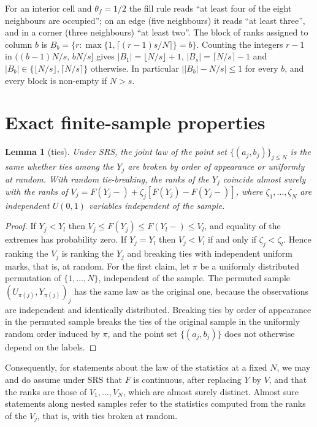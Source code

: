 \documentclass[11pt,a4paper]{article}
\newtheorem{lemma}[theorem]{Lemma}
\theoremstyle{definition}
\theoremstyle{remark}
\begin{document}
For an interior cell and $\theta_f=1/2$ the fill rule reads ``at least four of the eight neighbours are occupied''; on an edge (five neighbours) it reads ``at least three'', and in a corner (three neighbours) ``at least two''. The block of ranks assigned to column $b$ is $B_b=\{r:\max\{1,\lceil(r-1)s/N\rceil\}=b\}$. Counting the integers $r-1$ in $((b-1)N/s,\,bN/s]$ gives $|B_1|=\lfloor N/s\rfloor+1$, $|B_s|=\lceil N/s\rceil-1$ and $|B_b|\in\{\lfloor N/s\rfloor,\lceil N/s\rceil\}$ otherwise. In particular $\big||B_b|-N/s\big|\le1$ for every $b$, and every block is non-empty if $N>s$.

\section{Exact finite-sample properties}\label{sec:finite}

\begin{lemma}[ties]\label{lem:ties}
Under SRS, the joint law of the point set $\{(a_j,b_j)\}_{j\le N}$ is the same whether ties among the $Y_j$ are broken by order of appearance or uniformly at random. With random tie-breaking, the ranks of the $Y_j$ coincide almost surely with the ranks of $V_j=F(Y_j-)+\zeta_j[F(Y_j)-F(Y_j-)]$, where $\zeta_1,\dots,\zeta_N$ are independent $U(0,1)$ variables independent of the sample.
\end{lemma}

\begin{proof}
If $Y_j<Y_l$ then $V_j\le F(Y_j)\le F(Y_l-)\le V_l$, and equality of the extremes has probability zero. If $Y_j=Y_l$ then $V_j<V_l$ if and only if $\zeta_j<\zeta_l$. Hence ranking the $V_j$ is ranking the $Y_j$ and breaking ties with independent uniform marks, that is, at random. For the first claim, let $\pi$ be a uniformly distributed permutation of $\{1,\dots,N\}$, independent of the sample. The permuted sample $(U_{\pi(j)},Y_{\pi(j)})_j$ has the same law as the original one, because the observations are independent and identically distributed. Breaking ties by order of appearance in the permuted sample breaks the ties of the original sample in the uniformly random order induced by $\pi$, and the point set $\{(a_j,b_j)\}$ does not otherwise depend on the labels.
\end{proof}

Consequently, for statements about the law of the statistics at a fixed $N$, we may and do assume under SRS that $F$ is continuous, after replacing $Y$ by $V$, and that the ranks are those of $V_1,\dots,V_N$, which are almost surely distinct. Almost sure statements along nested samples refer to the statistics computed from the ranks of the $V_j$, that is, with ties broken at random.
\end{document}
